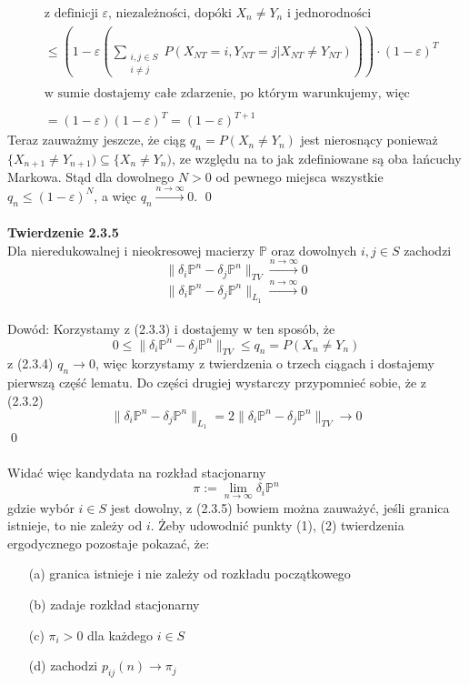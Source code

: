 \documentclass[a4paper]{article}
\begin{document}
    \begin{align*}
    &\text{z definicji $\varepsilon$, niezależności, dopóki $X_n \neq Y_n$ i jednorodności}\\
    &\leq \left( 1 - \varepsilon \left(\sum_{\substack{i,j \in S\\i\neq j}} P(X_{NT} = i, Y_{NT} = j | X_{NT} \neq Y_{NT})\right)\right)\cdot (1- \varepsilon)^T\\\\
    &\text{w sumie dostajemy całe zdarzenie, po którym warunkujemy, więc}
    \\\\
    &= (1-\varepsilon)(1-\varepsilon)^T = (1- \varepsilon)^{T+1}
\end{align*}
Teraz zauważmy jeszcze, że ciąg $q_n = P(X_n \neq Y_n)$ jest nierosnący ponieważ $\{X_{n+1} \neq Y_{n+1}) \subseteq \{X_{n} \neq Y_{n})$, ze względu na to jak zdefiniowane są oba łańcuchy Markowa. Stąd dla dowolnego $N > 0$ od pewnego miejsca wszystkie $q_n \leq (1-\varepsilon)^N$, a więc $q_n \xrightarrow{n \to \infty} 0$. \qed
\\\\
\textbf{Twierdzenie 2.3.5}\\
Dla nieredukowalnej i nieokresowej macierzy $\mathbb{P}$ oraz dowolnych $i, j \in S$ zachodzi $$\|\delta_i\mathbb{P}^n - \delta_j\mathbb{P}^n\|_{TV} \xrightarrow{n \to \infty} 0$$ $$\|\delta_i\mathbb{P}^n - \delta_j\mathbb{P}^n\|_{L_1} \xrightarrow{n \to \infty} 0$$
\\Dowód: Korzystamy z (2.3.3) i dostajemy w ten sposób, że $$0 \leq \|\delta_i\mathbb{P}^n - \delta_j\mathbb{P}^n\|_{TV} \leq q_n = P(X_n \neq Y_n)$$
z (2.3.4) $q_n \to 0$, więc korzystamy z twierdzenia o trzech ciągach i dostajemy pierwszą część lematu. Do części drugiej wystarczy przypomnieć sobie, że z (2.3.2) $$\|\delta_i\mathbb{P}^n - \delta_j\mathbb{P}^n\|_{L_1} = 2\|\delta_i\mathbb{P}^n - \delta_j\mathbb{P}^n\|_{TV} \to 0$$\qed \\
\\
Widać więc kandydata na rozkład stacjonarny $$\pi := \lim\limits_{n \to \infty} \delta_i\mathbb{P}^n$$ gdzie wybór $i \in S$ jest dowolny, z (2.3.5) bowiem można zauważyć, jeśli granica istnieje, to nie zależy od $i$. Żeby udowodnić punkty (1), (2) twierdzenia ergodycznego pozostaje pokazać, że:
\begin{enumerate}
	\item[(a)] granica istnieje i nie zależy od rozkładu początkowego
	\item[(b)] zadaje rozkład stacjonarny 
	\item[(c)] $\pi_i > 0$ dla każdego $i \in S$ 
	\item[(d)] zachodzi $p_{ij}(n) \to \pi_j$
\end{enumerate}
\end{document}

